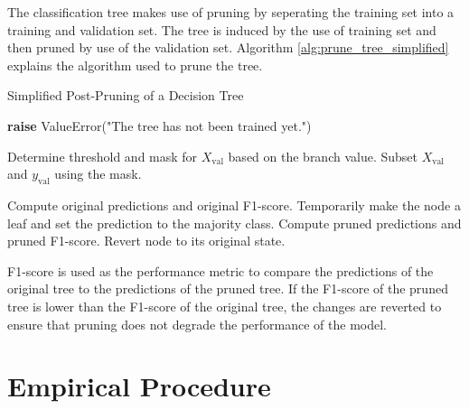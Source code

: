 \documentclass[10pt, conference]{IEEEtran}
\begin{document}
The classification tree makes use of pruning by seperating the training set into a training
and validation set. The tree is induced by the use of training set and then pruned by use of the
validation set. Algorithm \ref{alg:prune_tree_simplified} explains the algorithm used to 
prune the tree. 
\begin{algorithm}[H]
    \caption{Simplified Post-Pruning of a Decision Tree}
    \label{alg:prune_tree_simplified}
    \begin{algorithmic}[1]
                \State \textbf{raise} ValueError("The tree has not been trained yet.")
            \EndIf
            \State {}
        \EndFunction

                \Return
            \EndIf
            
                \State Determine threshold and mask for $X_{\text{val}}$ based on the branch value.
                \State Subset $X_{\text{val}}$ and $y_{\text{val}}$ using the mask.
                    \State {}
                \EndIf
            \EndFor
            
                \State Compute original predictions and original F1-score.
                \State Temporarily make the node a leaf and set the prediction to the majority class.
                \State Compute pruned predictions and pruned F1-score.
                    \State Revert node to its original state.
                \EndIf
            \EndIf
        \EndFunction
    \end{algorithmic}
\end{algorithm}

F1-score is used as the performance metric to compare the predictions of the original tree to the
predictions of the pruned tree. If the F1-score of the pruned tree is lower than the F1-score
of the original tree, the changes are reverted to ensure that pruning does not degrade the performance
of the model.

\section{Empirical Procedure} \label{section:Empirical Procedure}
\end{document}
